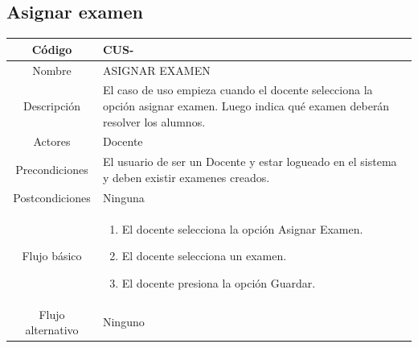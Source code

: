 \clearpage
\subsection{Asignar examen}
\begin{longtable}{|c|L{10cm}|}
	\hline
	Código &  CUS-\casodeuso\\  \hline
	Nombre &  ASIGNAR EXAMEN\\  \hline
	Descripción &  El caso de uso empieza cuando el docente selecciona la opción asignar examen. Luego indica qué examen deberán resolver los alumnos.\\  \hline
	Actores &  Docente\\  \hline
	Precondiciones &  El usuario de ser un Docente y estar logueado en el sistema y deben existir examenes creados.\\  \hline
	Postcondiciones &  Ninguna\\  \hline
	Flujo básico &    \begin{enumerate}
		\item El docente selecciona la opción Asignar Examen.
		\item El docente selecciona un examen.
		\item El docente presiona la opción Guardar.
	\end{enumerate}  \\ \hline
	Flujo alternativo & Ninguno \\  \hline
\end{longtable}

\clearpage
